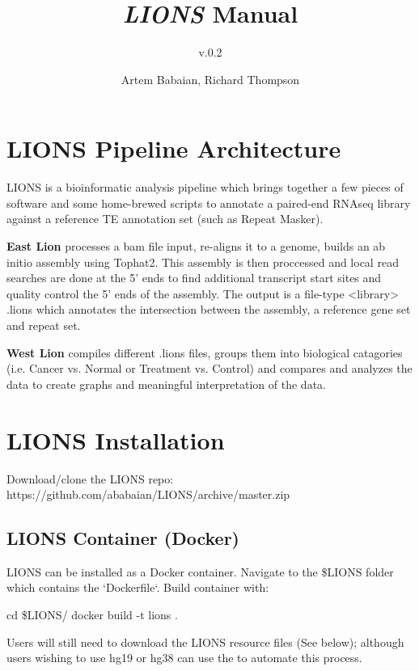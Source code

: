 \documentclass[11pt]{scrartcl}
\title{\textit{LIONS} Manual}
\subtitle{v.0.2}
\author{Artem Babaian, Richard Thompson}
\newcommand{\arrows}[1]{\textless #1\textgreater}
\begin{document}
\maketitle

\tableofcontents


\section{LIONS Pipeline Architecture}
LIONS is a bioinformatic analysis pipeline which brings together a
 few pieces of software and some home-brewed scripts to annotate a
 paired-end RNAseq library against a reference TE annotation set
 (such as Repeat Masker).

 \textbf{East Lion} processes a bam file input, re-aligns it to a genome,
 builds an ab initio assembly using Tophat2. This assembly is then
 proccessed and local read searches are done at the 5' ends to find
 additional transcript start sites and quality control the 5' ends of
 the assembly. The output is a file-type \arrows{library} .lions which
 annotates the intersection between the assembly, a reference gene set
 and repeat set.

 \textbf{West Lion} compiles different .lions files, groups them into biological
 catagories (i.e. Cancer vs. Normal or Treatment vs. Control) and
 compares and analyzes the data to create graphs and meaningful
 interpretation of the data.

\section{LIONS Installation}

Download/clone the LIONS repo: https://github.com/ababaian/LIONS/archive/master.zip

\subsection{LIONS Container (Docker)}

LIONS can be installed as a Docker container. Navigate to the \$LIONS folder which contains the `Dockerfile`. Build container with:

\begin{bash}
cd \$LIONS/
docker build -t lions .
\end{bash}

Users will still need to download the LIONS resource files (See below); although users wishing to use hg19 or hg38 can use the  to automate this process.
\end{document}

